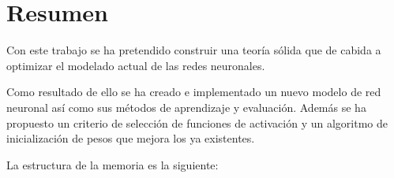 %


\chapter*{Resumen}\label{ch:resumen}
Con este trabajo se ha pretendido construir una teoría sólida que de cabida a optimizar el modelado actual de las redes neuronales.

Como resultado de ello se ha creado e implementado 
un nuevo modelo de red neuronal así como sus 
métodos de aprendizaje y evaluación. 
Además se ha propuesto un criterio de selección de 
funciones de activación y un algoritmo de 
inicialización de pesos que mejora los ya existentes. 

La estructura de la memoria es la siguiente: 

